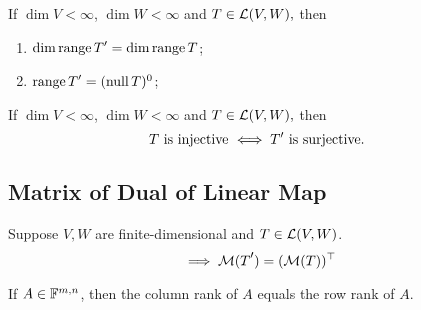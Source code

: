 \begin{thm}
    If $\dim V < \infty$, $\dim W<\infty$ and $T \in \mathcal{L} (V,W),$ then
    \begin{enumerate}
      \item $\dim \myrange \dual{T} = \dim \myrange T$;
      \item $\myrange \dual{T} = (\mynull T)^0$;
    \end{enumerate}
\end{thm}

\begin{thm} 
    If $\dim V < \infty$, $\dim W<\infty$ and $T \in \mathcal{L} (V,W),$ then
    \begin{equation}
      T $ is injective $ \iff \dual{T} $ is surjective. $
    \end{equation}
\end{thm}

\subsection{Matrix of Dual of Linear Map}

\setcounter{thm}{131}
\begin{thm}
  Suppose $V, W$ are finite-dimensional and $T \in \mathcal{L}(V,W)$.
  \begin{equation}
    \implies \mmatrix(\dual{T}) = (\mmatrix(T))^{\top}
  \end{equation}
\end{thm}

\begin{thm}
  If $A \in \mathbb{F}^{m,n}$, then the column rank of $A$ equals the row rank of $A$.
\end{thm}
